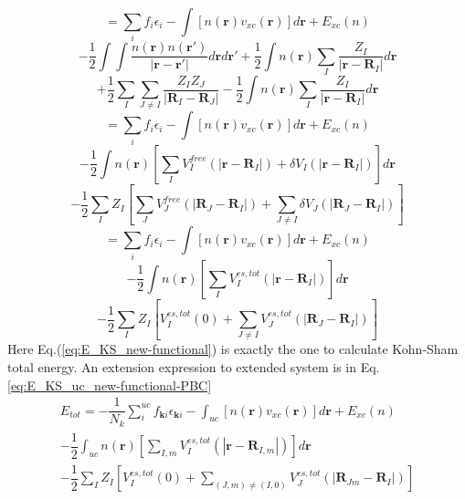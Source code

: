 \[
=\sum_{i}{f_i \epsilon_{i}}-\int{[n(\mathbf{r}) v_{xc}(\mathbf{r})] d\mathbf{r}} +E_{xc}(n)
\]
\[
-\dfrac{1}{2}\int \int {\dfrac{n(\mathbf{r}) n(\mathbf{r'}) }{|\mathbf{r}-\mathbf{r'} |}  d\mathbf{r}  d\mathbf{r'}} 
+\dfrac{1}{2}\int {n(\mathbf{r})  \sum_{I}\dfrac{Z_{I}}{|\mathbf{r}-\mathbf{R}_{I}|}  d\mathbf{r}}
\]
\begin{equation}
+\dfrac{1}{2}\sum_{I}\sum_{J\neq I}{\dfrac{Z_{I} Z_{J}}{|\mathbf{R}_{I}-\mathbf{R}_{J} |} }
-\dfrac{1}{2}\int {n(\mathbf{r})  \sum_{I}\dfrac{Z_{I}}{|\mathbf{r}-\mathbf{R}_{I}|}  d\mathbf{r} }
\end{equation}
\[
=\sum_{i}{f_i \epsilon_{i}}-\int{[n(\mathbf{r}) v_{xc}(\mathbf{r})] d\mathbf{r}} +E_{xc}(n)
\]
\[
-\dfrac{1}{2}\int n(\mathbf{r}) [\sum_{I} V^{free}_I(|\mathbf{r}-\mathbf{R}_I|)+\delta V_I(|\mathbf{r}-\mathbf{R}_I|) ]   d\mathbf{r}
\]
\begin{equation}
-\dfrac{1}{2}\sum_{I}Z_{I} [\sum_{J} V^{free}_J(|\mathbf{R}_J-\mathbf{R}_I|)+\sum_{J\ne I}\delta V_J(|\mathbf{R}_J-\mathbf{R}_I|) ]  
\end{equation}
\[
=\sum_{i}{f_i \epsilon_{i}}-\int{[n(\mathbf{r}) v_{xc}(\mathbf{r})] d\mathbf{r}} +E_{xc}(n)
\]
\[
-\dfrac{1}{2}\int n(\mathbf{r}) [\sum_{I} V^{es,tot}_I(|\mathbf{r}-\mathbf{R}_I|)]   d\mathbf{r}
\]
\begin{equation}
-\dfrac{1}{2}\sum_{I}Z_{I} [V^{es,tot}_I(0)+\sum_{J\ne I} V^{es,tot}_J(|\mathbf{R}_J-\mathbf{R}_I|) ]  
\label{eq:E_KS_new-functional}
\end{equation}
Here Eq.(\ref{eq:E_KS_new-functional}) is exactly the one to calculate Kohn-Sham total energy. An 
extension expression to extended system is in Eq.\ref{eq:E_KS_uc_new-functional-PBC}
\begin{eqnarray}
\label{eq:E_KS_uc_new-functional-PBC}
E_{tot}=-\dfrac{1}{N_k}\sum_{i}^{uc}{f_{\mathbf{k}i} \epsilon_{\mathbf{k}i}}-\int_{uc}{[n(\mathbf{r}) v_{xc}(\mathbf{r})] d\mathbf{r}} +E_{xc}(n) \\
-\dfrac{1}{2}\int_{uc} n(\mathbf{r}) [\sum_{I,m} V^{es,tot}_I(|\mathbf{r}-\mathbf{R}_{I,m}|)]   d\mathbf{r}   \nonumber \\
-\dfrac{1}{2}\sum_{I}Z_{I} [V^{es,tot}_I(0)+\sum_{(J,m)\ne (I,0)} V^{es,tot}_J(|\mathbf{R}_{Jm}-\mathbf{R}_{I}|) ]  \nonumber
\end{eqnarray}


